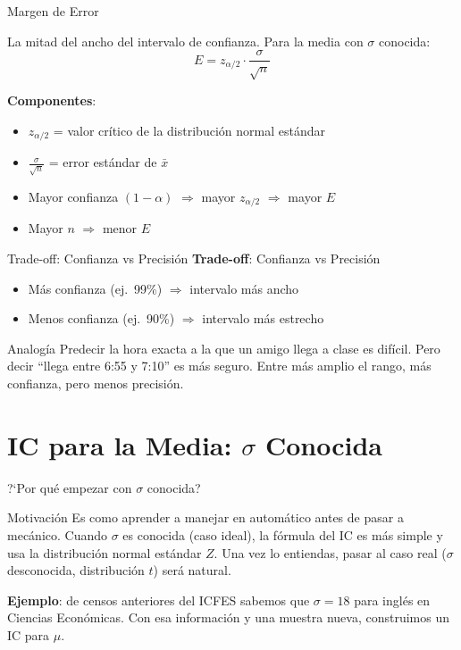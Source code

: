 \documentclass[aspectratio=169, 11pt]{beamer}
\begin{document}
\begin{frame}{Margen de Error}
\begin{definition}
La mitad del ancho del intervalo de confianza. Para la media con $\sigma$ conocida:
\[
E = z_{\alpha/2} \cdot \frac{\sigma}{\sqrt{n}}
\]
\end{definition}

\vspace{0.2cm}
\textbf{Componentes}:
\begin{itemize}
  \item $z_{\alpha/2}$ = valor cr\'itico de la distribuci\'on normal est\'andar
  \item $\frac{\sigma}{\sqrt{n}}$ = error est\'andar de $\bar{x}$
  \item Mayor confianza $(1-\alpha)$ $\Rightarrow$ mayor $z_{\alpha/2}$ $\Rightarrow$ mayor $E$
  \item Mayor $n$ $\Rightarrow$ menor $E$
\end{itemize}
\end{frame}

\begin{frame}{Trade-off: Confianza vs Precisi\'on}
\textbf{Trade-off}: Confianza vs Precisi\'on
\begin{itemize}
  \item M\'as confianza (ej.\ 99\%) $\Rightarrow$ intervalo m\'as ancho
  \item Menos confianza (ej.\ 90\%) $\Rightarrow$ intervalo m\'as estrecho
\end{itemize}

\begin{exampleblock}{Analog\'ia}
Predecir la hora exacta a la que un amigo llega a clase es dif\'icil. Pero decir ``llega entre 6:55 y 7:10'' es m\'as seguro. Entre m\'as amplio el rango, m\'as confianza, pero menos precisi\'on.
\end{exampleblock}
\end{frame}

\section{IC para la Media: $\sigma$ Conocida}

\begin{frame}{?`Por qu\'e empezar con $\sigma$ conocida?}
\begin{exampleblock}{Motivaci\'on}
Es como aprender a manejar en autom\'atico antes de pasar a mec\'anico. Cuando $\sigma$ es conocida (caso ideal), la f\'ormula del IC es m\'as simple y usa la distribuci\'on normal est\'andar $Z$. Una vez lo entiendas, pasar al caso real ($\sigma$ desconocida, distribuci\'on $t$) ser\'a natural.
\end{exampleblock}

\textbf{Ejemplo}: de censos anteriores del ICFES sabemos que $\sigma = 18$ para ingl\'es en Ciencias Econ\'omicas. Con esa informaci\'on y una muestra nueva, construimos un IC para $\mu$.
\end{frame}
\end{document}
